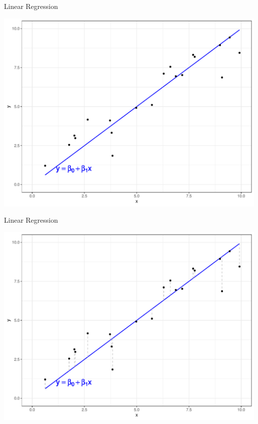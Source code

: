 \documentclass[aspectratio=169,11pt]{beamer}
\begin{document}
\begin{frame}{Linear Regression}

	\begin{center}
		\includegraphics[scale=0.35]{figures/regPoints.pdf} 
	\end{center}

\end{frame}

\begin{frame}{Linear Regression}

	\begin{center}
		\includegraphics[scale=0.35]{figures/regPoints_resid.pdf} 
	\end{center}
	
\end{frame}
\end{document}
